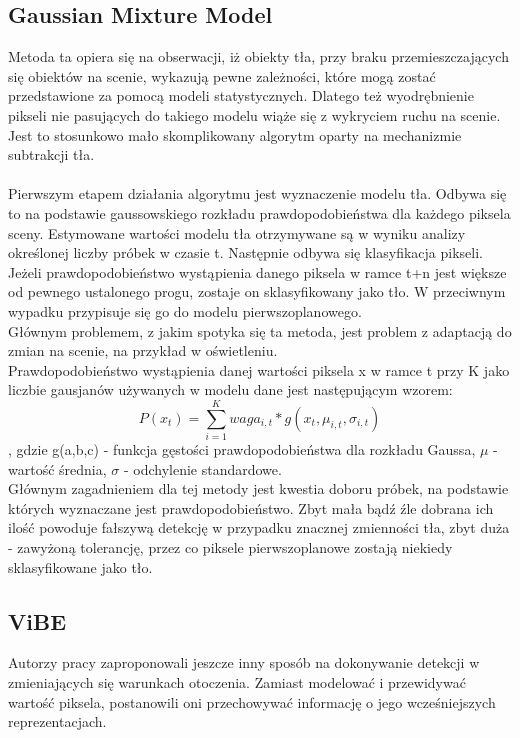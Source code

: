 \subsection{Gaussian Mixture Model}
\label{sec:GMM}
Metoda ta \cite{zivkovic2004improved} opiera się na obserwacji, iż obiekty tła, przy braku przemieszczających się obiektów na scenie, wykazują pewne zależności, które mogą zostać przedstawione za pomocą modeli statystycznych. Dlatego też wyodrębnienie pikseli nie pasujących do takiego modelu wiąże się z wykryciem ruchu na scenie. Jest to stosunkowo mało skomplikowany algorytm oparty na mechanizmie subtrakcji tła.
\paragraph{}
Pierwszym etapem działania algorytmu jest wyznaczenie modelu tła. Odbywa się to na podstawie gaussowskiego rozkładu prawdopodobieństwa dla każdego piksela sceny. Estymowane wartości modelu tła otrzymywane są w wyniku analizy określonej liczby próbek w czasie t. Następnie odbywa się klasyfikacja pikseli. Jeżeli prawdopodobieństwo wystąpienia danego piksela w ramce t+n jest większe od pewnego ustalonego progu, zostaje on sklasyfikowany jako tło. W przeciwnym wypadku przypisuje się go do modelu pierwszoplanowego.\\
Głównym problemem, z jakim spotyka się ta metoda, jest problem z adaptacją do zmian na scenie, na przykład w oświetleniu.\\
Prawdopodobieństwo wystąpienia danej wartości piksela x w ramce t przy K jako liczbie gausjanów używanych w modelu dane jest następującym wzorem:
\begin{equation}
P(x_{t}) = \sum_{i=1}^{K} waga_{i,t}*g(x_{t},\mu_{i,t},\sigma_{i,t})
\end{equation}
, gdzie g(a,b,c) - funkcja gęstości prawdopodobieństwa dla rozkładu Gaussa, $\mu$ - wartość średnia, $\sigma$ - odchylenie standardowe.\\
Głównym zagadnieniem dla tej metody jest kwestia doboru próbek, na podstawie których wyznaczane jest prawdopodobieństwo. Zbyt mała bądź źle dobrana ich ilość powoduje fałszywą detekcję w przypadku znacznej zmienności tła, zbyt duża - zawyżoną tolerancję, przez co piksele pierwszoplanowe zostają niekiedy sklasyfikowane jako tło.

\subsection{ViBE}
Autorzy pracy \cite{barnich2011vibe} zaproponowali jeszcze inny sposób na dokonywanie detekcji w zmieniających się warunkach otoczenia. Zamiast modelować i przewidywać wartość piksela, postanowili oni przechowywać informację o jego wcześniejszych reprezentacjach.
